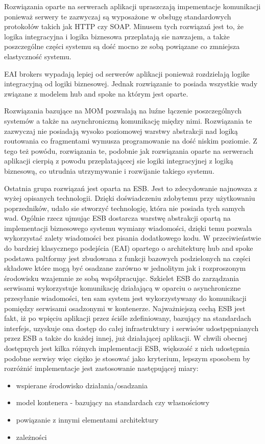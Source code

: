 Rozwiązania oparte na serwerach aplikacji upraszczają impementacje komunikacji ponieważ serwery te zazwyczaj są wyposażone w obsługę standardowych protokołów takich jak HTTP czy SOAP. Minusem tych rozwiązań jest to, że logika integracyjna i logika biznesowa przeplatają sie nawzajem, a także poszczególne części systemu są dość mocno ze sobą powiązane co zmniejsza elastyczność systemu.

EAI brokers wypadają lepiej od serwerów aplikacji ponieważ rozdzielają logike integracyjną od logiki biznesowej. Jednak rozwiązanie to posiada wszystkie wady związane z modelem hub and spoke na którym jest oparte.

Rozwiązania bazujące na MOM pozwalają na luźne łączenie poszczególnych systemów a także na asynchroniczną komunikację między nimi. Rozwiązania te zazwyczaj nie posiadają wysoko poziomowej warstwy abstrakcji nad logiką routowania co fragmentami wymusza programowanie na dość niskim poziomie. Z tego też powódu, rozwiązania te, podobnie jak rozwiązania oparte na serwerach aplikacji cierpią z powodu przeplatającecj sie logiki integracyjnej z logiką biznesową, co utrudnia utrzymywanie i rozwijanie takiego systemu.

Ostatnia grupa rozwiązań jest oparta na ESB. Jest to zdecydowanie najnowsza z wyżej opisanych technologii. Dzięki doświadczeniu zdobytemu przy użytkowaniu poprzedników, udało sie stworzyć technologię, która nie posiada tych samych wad. Ogólnie rzecz ujmując ESB dostarcza warstwę abstrakcji opartą na implementacji biznesowego systemu wymiany wiadomości, dzięki temu pozwala wykorzystać zalety wiadomości bez pisania dodatkowego kodu. W przeciwieństwie do bardziej klasycznego podejścia (EAI) opartego o architekturę hub and spoke podstawa paltformy jest zbudowana z funkcji bazowych podzielonych na części składowe które mogą być osadzane zarówno w jednolitym jak i rozproszonym środowisku wzajemnie ze sobą współpracując. Szkielet ESB do zarządzania serwisami wykorzystuje komunikację działającą w oparciu o asynchroniczne przesyłanie wiadomości, ten sam system jest wykorzystywany do komunikacji pomiędzy serwisami osadzonymi w kontenerze. Najważniejszą cechą ESB jest fakt, iż po wpięciu aplikacji przez ściśle zdefiniowany, bazujący na standardach interfejs, uzyskuje ona dostęp do całej infrastruktury i serwisów udostpępnianych przez ESB a także do każdej innej, już działającej aplikacji. W chwili obecnej dostępnych jest kilka różnych implementacji ESB, większość z nich udostępnia podobne serwisy więc ciężko je stosować jako kryterium, lepszym sposobem by rozróżnić implementacje jest zastosowanie następującej miary:
\begin{itemize}
	\item wspierane środowisko działania/osadzania
	\item model kontenera - bazujący na standardach czy własnościowy
	\item powiązanie z innymi elementami architektury
	\item zależności
\end{itemize}

